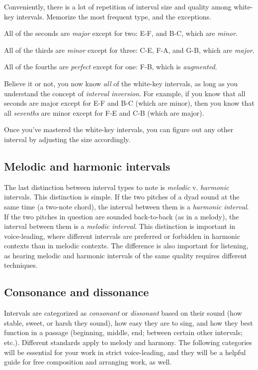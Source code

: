 \documentclass{book}
\begin{document}
Conveniently, there is a lot of repetition of interval size and quality among
white-key intervals. Memorize the most frequent type, and the exceptions.

All of the seconds are \emph{major} except for two: E-F, and B-C, which are
\emph{minor}.

All of the thirds are \emph{minor} except for three: C-E, F-A, and G-B, which
are \emph{major}.

All of the fourths are \emph{perfect} except for one: F-B, which is
\emph{augmented}.

Believe it or not, you now know \emph{all} of the white-key intervals, as long
as you understand the concept of \emph{interval inversion}. For example, if
you know that all seconds are major except for E-F and B-C (which are minor),
then you know that all \emph{sevenths} are minor except for F-E and C-B (which
are major).

Once you've mastered the white-key intervals, you can figure out any other
interval by adjusting the size accordingly.

\hypertarget{melodic-and-harmonic-intervals}{%
\subsection{Melodic and harmonic
intervals}\label{melodic-and-harmonic-intervals}}

The last distinction between interval types to note is \emph{melodic} v.
\emph{harmonic} intervals. This distinction is simple. If the two pitches of a
dyad sound at the same time (a two-note chord), the interval between them is a
\emph{harmonic interval}. If the two pitches in question are sounded
back-to-back (as in a melody), the interval between them is a \emph{melodic
interval}. This distinction is important in voice-leading, where different
intervals are preferred or forbidden in harmonic contexts than in melodic
contexts. The difference is also important for listening, as hearing melodic
and harmonic intervals of the same quality requires different techniques.

\hypertarget{consonance-and-dissonance}{%
\subsection{Consonance and dissonance}\label{consonance-and-dissonance}}

Intervals are categorized as \emph{consonant} or \emph{dissonant} based on
their sound (how stable, sweet, or harsh they sound), how easy they are to
sing, and how they best function in a passage (beginning, middle, end; between
certain other intervals; etc.). Different standards apply to melody and
harmony. The following categories will be essential for your work in strict
voice-leading, and they will be a helpful guide for free composition and
arranging work, as well.
\end{document}
